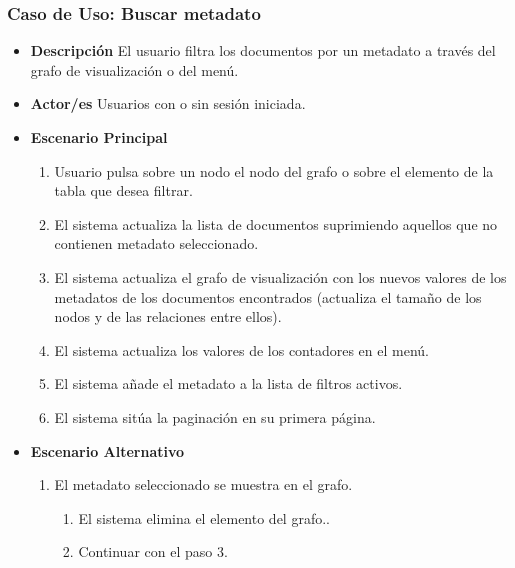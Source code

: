 \subsubsection{Caso de Uso: Buscar \gls{metadato}}
\begin{itemize}
	\item{\textbf{Descripción}} El usuario filtra los documentos por un \gls{metadato} a través del grafo de visualización o del menú.
    \item{\textbf{Actor/es}} Usuarios con o sin sesión iniciada.
    \item{\textbf{Escenario Principal}}
    	\begin{enumerate}
        	\item Usuario pulsa sobre un nodo el nodo del grafo o sobre el elemento de la tabla que desea filtrar.
        	\item El sistema actualiza la lista de documentos suprimiendo aquellos que no contienen \gls{metadato} seleccionado.
            \item El sistema actualiza el grafo de visualización con los nuevos valores de los \glspl{metadato} de los documentos encontrados (actualiza el tamaño de los nodos y de las relaciones entre ellos).
            \item El sistema actualiza los valores de los contadores en el menú.
            \item El sistema añade el \gls{metadato} a la lista de filtros activos.
            \item El sistema sitúa la paginación en su primera página. 
        \end{enumerate}
    \item{\textbf{Escenario Alternativo}}
    	\begin{enumerate}[label=2.\alph*]
    		\item El \gls{metadato} seleccionado se muestra en el grafo.
            \begin{enumerate}[label=\arabic*]
            	\item El sistema elimina el elemento del grafo..
            	\item Continuar con el paso 3.
            \end{enumerate}
        \end{enumerate}
\end{itemize}

